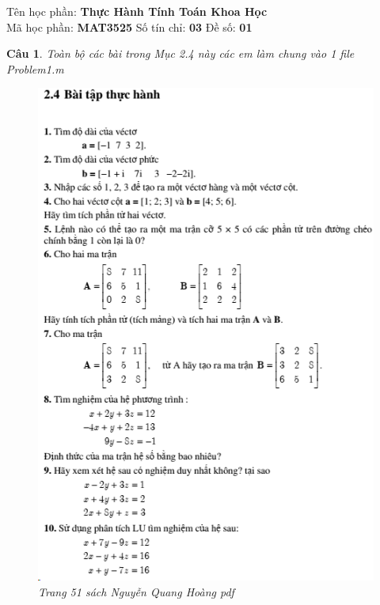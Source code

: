 \documentclass[11pt]{article}
\newtheorem{bt}{Câu}
\begin{document}



\begin{center}
Tên học phần: {\bf Thực Hành Tính Toán Khoa Học} \\ 
Mã học phần: \textbf{MAT3525}	\quad Số tín chỉ: \textbf{03} \quad	Đề số: \textbf{01} \\ 
\end{center}

\begin{bt}
Toàn bộ các bài trong Mục 2.4 này các em làm chung vào 1 file Problem1.m \\
%	
\begin{figure}[h!]
	\centering
	\includegraphics[width=0.65\linewidth]{K65_1}
	\caption{Trang 51 sách Nguyễn Quang Hoàng pdf}
	\label{fig:k651}
\end{figure}
\end{bt}

\newpage 
\end{document}
